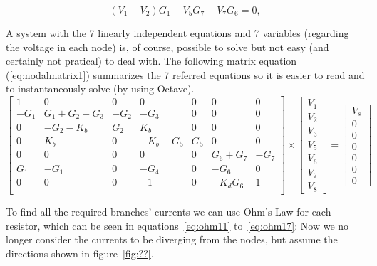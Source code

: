 \begin{equation}
  (V_{1} - V_{2})G_{1} - V_{5}G_{7} - V_{7}G_{6} = 0,
  \label{eq:supernode1}
\end{equation}

A system with the 7 linearly independent equations and 7 variables (regarding the voltage in each node) is, of course, possible to solve but not easy (and certainly not pratical) to deal with. The following matrix equation (\ref{eq:nodalmatrix1}) summarizes the 7 referred equations so it is easier to read and to instantaneously solve (by using Octave).
\begin{equation}
\left[ \begin{array}{ccccccc} 
		1 & 0 & 0 & 0 & 0 & 0 & 0 \\ 
		-G_1 & G_1+G_2+G_3 & -G_2 & -G_3 & 0 & 0 & 0 \\
		0 & -G_2-K_b & G_2 & K_b & 0 & 0 & 0 \\ 
		0 & K_b & 0 & -K_b-G_5 & G_5 & 0 & 0  \\ 
		0 & 0 & 0 & 0 & 0 & G_6+G_7 & -G_7  \\ 
		G_1 & -G_1 & 0 & -G_4 & 0 & -G_6 & 0  \\ 
		0 & 0 & 0 & -1 & 0 & -K_dG_6 & 1 \\ 

\end{array} \right]
\times \left[ \begin{array}{c} V_1 \\ V_2 \\ V_3 \\  V_5 \\ V_6 \\ V_7 \\ V_8 \end{array} \right] =
\left[ \begin{array}{c} V_s \\ 0 \\ 0 \\ 0 \\ 0 \\ 0 \\ 0  \end{array} \right]
\label{eq:nodalmatrix1}
\end{equation}

To find all the required branches' currents we can use Ohm's Law for each resistor, which can be seen in equations~\ref{eq:ohm11} to~\ref{eq:ohm17}: Now we no longer consider the currents to be diverging from the nodes, but assume the directions shown in figure~\ref{fig:??}.

